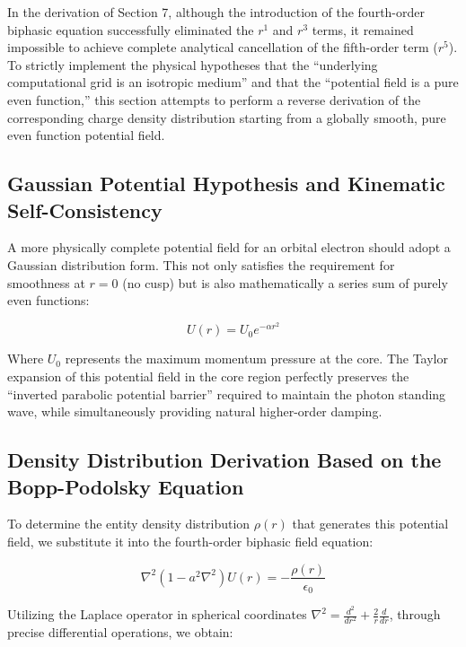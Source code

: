\documentclass[12pt, a4paper]{article}
\begin{document}
In the derivation of Section 7, although the introduction of the fourth-order biphasic equation successfully eliminated the $r^1$ and $r^3$ terms, it remained impossible to achieve complete analytical cancellation of the fifth-order term ($r^5$). To strictly implement the physical hypotheses that the ``underlying computational grid is an isotropic medium'' and that the ``potential field is a pure even function,'' this section attempts to perform a reverse derivation of the corresponding charge density distribution starting from a globally smooth, pure even function potential field.

\subsection{Gaussian Potential Hypothesis and Kinematic Self-Consistency}

A more physically complete potential field for an orbital electron should adopt a Gaussian distribution form. This not only satisfies the requirement for smoothness at $r=0$ (no cusp) but is also mathematically a series sum of purely even functions:

\begin{equation}
U(r) = U_0 e^{-\alpha r^2}
\end{equation}

Where $U_0$ represents the maximum momentum pressure at the core. The Taylor expansion of this potential field in the core region perfectly preserves the ``inverted parabolic potential barrier'' required to maintain the photon standing wave, while simultaneously providing natural higher-order damping.

\subsection{Density Distribution Derivation Based on the Bopp-Podolsky Equation}

To determine the entity density distribution $\rho(r)$ that generates this potential field, we substitute it into the fourth-order biphasic field equation:

\begin{equation}
\nabla^2(1 - a^2\nabla^2)U(r) = -\frac{\rho(r)}{\epsilon_0}
\end{equation}

Utilizing the Laplace operator in spherical coordinates $\nabla^2 = \frac{d^2}{dr^2} + \frac{2}{r}\frac{d}{dr}$, through precise differential operations, we obtain:
\end{document}
